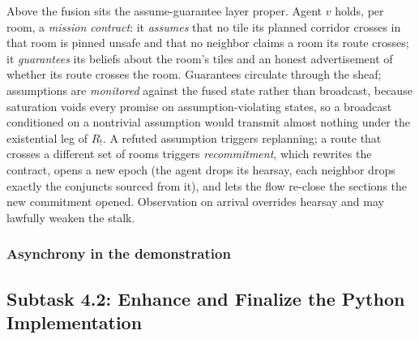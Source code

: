\documentclass[11pt]{article}
\newif\ifshowcomments
\theoremstyle{definition}
\theoremstyle{remark}
\newcommand{\task}[1]{%
    \ifshowcomments
        ~\todo[inline, color=buzzgold!60, textcolor=black,caption={Task}]{{\bf Task:} #1}%
    \fi
}
\newcommand{\ai}[1]{%
    \ifshowcomments
        \noindent\textcolor{techred}{[AI Agent]: #1}%
    \fi
}
\begin{document}
Above the fusion sits the assume-guarantee layer proper.
Agent $v$ holds, per room, a \emph{mission contract}: it \emph{assumes} that no tile its
planned corridor crosses in that room is pinned unsafe and that no neighbor claims a room its
route crosses; it \emph{guarantees} its beliefs about the room's tiles and an honest
advertisement of whether its route crosses the room.
Guarantees circulate through the sheaf; assumptions are \emph{monitored} against the fused
state rather than broadcast, because saturation voids every promise on assumption-violating
states, so a broadcast conditioned on a nontrivial assumption would transmit almost nothing
under the existential leg of $R_!$.
A refuted assumption triggers replanning; a route that crosses a different set of rooms
triggers \emph{recommitment}, which rewrites the contract, opens a new epoch (the agent drops
its hearsay, each neighbor drops exactly the conjuncts sourced from it), and lets the flow
re-close the sections the new commitment opened.
Observation on arrival overrides hearsay and may lawfully weaken the stalk.

\subsubsection{Asynchrony in the demonstration}
\label{sec:async-gap}

\task{Drive the Robotarium demonstration from a live but partial firing sequence with a
configurable message-drop probability, so that the asynchrony claim is exercised by the robots
and not only by the test suite.}

\ai{\textbf{Gap closed since drafted.} An earlier draft of this section flagged that the
demonstration ran only the synchronous schedule $\tau_t = V$. The delivered demonstration
no longer does: sweeps fire on a coarse clock and on the neighborhood of any agent about to
plan, agents depart asynchronously (each leaves the moment it arrives, under a round-robin
motion schedule), and the physical run's returned footage shows sections closing under exactly
these partial firing sets. A configurable message-drop probability remains unexercised on the
robots---the task box above is retained for that residue---but the asynchrony claim now rests
on the testbed as well as the test suite.}

\subsection{Subtask 4.2: Enhance and Finalize the Python Implementation}
\label{sec:subtask42}
\end{document}
